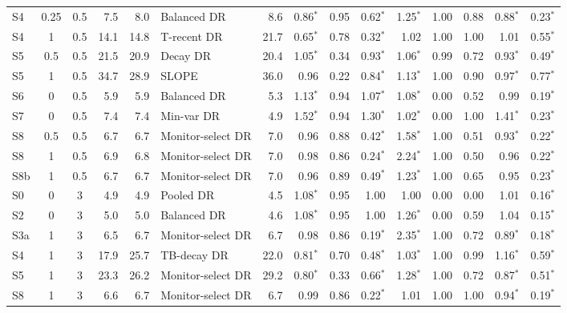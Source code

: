 \begin{table}[t]
{\begin{tabular}{@{}lccrrlrrrrrrrrr@{}}
S4 & 0.25 & 0.5 & 7.5 & 8.0 & Balanced DR & 8.6 & 0.86$^{*}$ & 0.95 & 0.62$^{*}$ & 1.25$^{*}$ & 1.00 & 0.88 & 0.88$^{*}$ & 0.23$^{*}$ \\
S4 & 1 & 0.5 & 14.1 & 14.8 & T-recent DR & 21.7 & 0.65$^{*}$ & 0.78 & 0.32$^{*}$ & 1.02 & 1.00 & 1.00 & 1.01 & 0.55$^{*}$ \\
S5 & 0.5 & 0.5 & 21.5 & 20.9 & Decay DR & 20.4 & 1.05$^{*}$ & 0.34 & 0.93$^{*}$ & 1.06$^{*}$ & 0.99 & 0.72 & 0.93$^{*}$ & 0.49$^{*}$ \\
S5 & 1 & 0.5 & 34.7 & 28.9 & SLOPE & 36.0 & 0.96 & 0.22 & 0.84$^{*}$ & 1.13$^{*}$ & 1.00 & 0.90 & 0.97$^{*}$ & 0.77$^{*}$ \\
S6 & 0 & 0.5 & 5.9 & 5.9 & Balanced DR & 5.3 & 1.13$^{*}$ & 0.94 & 1.07$^{*}$ & 1.08$^{*}$ & 0.00 & 0.52 & 0.99 & 0.19$^{*}$ \\
S7 & 0 & 0.5 & 7.4 & 7.4 & Min-var DR & 4.9 & 1.52$^{*}$ & 0.94 & 1.30$^{*}$ & 1.02$^{*}$ & 0.00 & 1.00 & 1.41$^{*}$ & 0.23$^{*}$ \\
S8 & 0.5 & 0.5 & 6.7 & 6.7 & Monitor-select DR & 7.0 & 0.96 & 0.88 & 0.42$^{*}$ & 1.58$^{*}$ & 1.00 & 0.51 & 0.93$^{*}$ & 0.22$^{*}$ \\
S8 & 1 & 0.5 & 6.9 & 6.8 & Monitor-select DR & 7.0 & 0.98 & 0.86 & 0.24$^{*}$ & 2.24$^{*}$ & 1.00 & 0.50 & 0.96 & 0.22$^{*}$ \\
S8b & 1 & 0.5 & 6.7 & 6.7 & Monitor-select DR & 7.0 & 0.96 & 0.89 & 0.49$^{*}$ & 1.23$^{*}$ & 1.00 & 0.65 & 0.95 & 0.23$^{*}$ \\
S0 & 0 & 3 & 4.9 & 4.9 & Pooled DR & 4.5 & 1.08$^{*}$ & 0.95 & 1.00 & 1.00 & 0.00 & 0.00 & 1.01 & 0.16$^{*}$ \\
S2 & 0 & 3 & 5.0 & 5.0 & Balanced DR & 4.6 & 1.08$^{*}$ & 0.95 & 1.00 & 1.26$^{*}$ & 0.00 & 0.59 & 1.04 & 0.15$^{*}$ \\
S3a & 1 & 3 & 6.5 & 6.7 & Monitor-select DR & 6.7 & 0.98 & 0.86 & 0.19$^{*}$ & 2.35$^{*}$ & 1.00 & 0.72 & 0.89$^{*}$ & 0.18$^{*}$ \\
S4 & 1 & 3 & 17.9 & 25.7 & TB-decay DR & 22.0 & 0.81$^{*}$ & 0.70 & 0.48$^{*}$ & 1.03$^{*}$ & 1.00 & 0.99 & 1.16$^{*}$ & 0.59$^{*}$ \\
S5 & 1 & 3 & 23.3 & 26.2 & Monitor-select DR & 29.2 & 0.80$^{*}$ & 0.33 & 0.66$^{*}$ & 1.28$^{*}$ & 1.00 & 0.72 & 0.87$^{*}$ & 0.51$^{*}$ \\
S8 & 1 & 3 & 6.6 & 6.7 & Monitor-select DR & 6.7 & 0.99 & 0.86 & 0.22$^{*}$ & 1.01 & 1.00 & 1.00 & 0.94$^{*}$ & 0.19$^{*}$ \\
\bottomrule\end{tabular}}\end{table}
